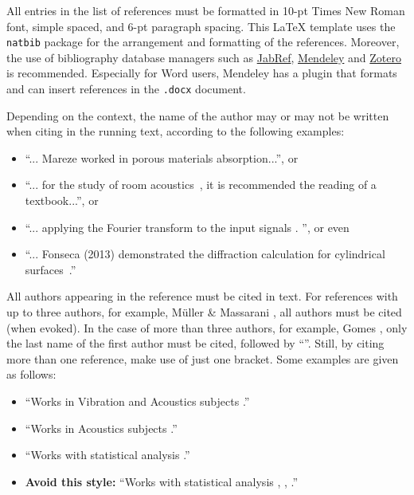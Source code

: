 \documentclass[12pt, a4paper, twoside, twocolumn]{article}
\begin{document}
All entries in the list of references must be formatted in 10-pt Times New Roman font, simple spaced, and 6-pt paragraph spacing. This \LaTeX\xspace template uses the \texttt{natbib} package for the arrangement and formatting of the references. Moreover, the use of bibliography database managers such as \href{http://www.jabref.org/}{JabRef}, \href{http://www.mendeley.com}{Mendeley} and \href{https://www.zotero.org/}{Zotero} is recommended. Especially for Word users, Mendeley has a plugin that formats and can insert references in the \texttt{.docx} document.

Depending on the context, the name of the author may or may not be written when citing in the running text, according to the following examples:

\begin{itemize}[noitemsep,topsep=0ex] \itemsep=4pt
	\item 	``... Mareze \etal \cite{Mareze-2019} worked in porous materials absorption...'', or
	\item ``... for the study of room acoustics~\cite{Brandao-2017}, it is recommended the reading of a textbook...'', or
	\item ``... applying the Fourier transform to the input signals \cite{Oppenheim-1996}. '', or even
	\item ``... Fonseca (2013) demonstrated the diffraction calculation for cylindrical surfaces~\cite{Fonseca-2013}.''
\end{itemize}

All authors appearing in the reference must be cited in text. 
For references with up to three authors, for example,  Müller \& Massarani \cite{Muller-2001}, all authors must be cited (when evoked). In the case of more than three authors, for example, Gomes \etal \cite{Gomes-2015}, only the last name of the first author must be cited, followed by ``\etal''. Still, by citing more than one reference, make use of just one bracket. Some examples are given as follows:

\begin{itemize}[noitemsep,topsep=0ex] \itemsep=8pt
	\item ``Works in Vibration and Acoustics subjects \cite{Mareze-2017,Fonseca-2013,Brandao-2017}.''
	\item ``Works in Acoustics subjects \cite{Mareze-2017,Oppenheim-1996,Muller-2001,Mareze-2019}.''
	\item ``Works with statistical analysis \cite{Mareze-2017, Brandao-2017, Borges-2018}.''
	\item \textbf{Avoid this style:} ``Works with statistical analysis \cite{Mareze-2017}, \cite{Brandao-2017}, \cite{Ristow-2016}.''
\end{itemize}
\end{document}
